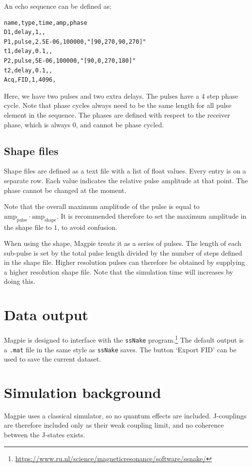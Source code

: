 \documentclass[11pt,a4paper]{article}
\begin{document}
An echo sequence can be defined as:

\begin{verbatim}
name,type,time,amp,phase
D1,delay,1,,
P1,pulse,2.5E-06,100000,"[90,270,90,270]"
t1,delay,0.1,,
P2,pulse,5E-06,100000,"[90,0,270,180]"
t2,delay,0.1,,
Acq,FID,1,4096,
\end{verbatim}
Here, we have two pulses and two extra delays. The pulses have a 4 step phase cycle. Note that phase cycles always need to be the same length for all pulse element in the sequence. The phases are defined with respect to the receiver phase, which is always 0, and cannot be phase cycled.


\subsection{Shape files}\label{sec:shape}
Shape files are defined as a text file with a list of float values. Every entry is on a separate row. Each value indicates the relative pulse amplitude at that point. The phase cannot be changed at the moment.

Note that the overall maximum amplitude of the pulse is equal to $\text{amp}_\text{pulse} \cdot \text{amp}_\text{shape}$. It is recommended therefore to set the maximum amplitude in the shape file to $1$, to avoid confusion.

When using the shape, Magpie treats it as a series of pulses. The length of each sub-pulse is set by the total pulse length divided by the number of steps defined in the shape file. Higher resolution pulses can therefore be obtained by supplying a higher resolution shape file. Note that the simulation time will increases by doing this.




\section{Data output}
Magpie is designed to interface with the \texttt{ssNake} program.\footnote{\url{https://www.ru.nl/science/magneticresonance/software/ssnake/}} The default output is a \texttt{.mat} file in the same style as \texttt{ssNake} saves. The button `Export FID' can be used to save the current dataset.



\section{Simulation background}
Magpie uses a classical simulator, so no quantum effects are included. J-couplings are therefore included only as their weak coupling limit, and no coherence between the J-states exists.
\end{document}
